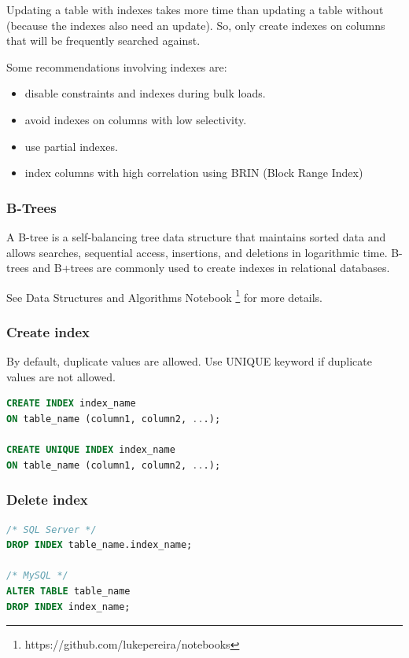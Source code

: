 \documentclass{article}
\begin{document}
Updating a table with indexes takes more time than updating a table without (because the indexes also need an update). So, only create indexes on columns that will be frequently searched against.

Some recommendations involving indexes are:
\begin{itemize}
    \item disable constraints and indexes during bulk loads.
    \item avoid indexes on columns with low selectivity.
    \item use partial indexes.
    \item index columns with high correlation using BRIN (Block Range Index)
\end{itemize}

\subsubsection{B-Trees}
A B-tree is a self-balancing tree data structure that maintains sorted data and allows searches, sequential access, insertions, and deletions in logarithmic time. B-trees and B+trees are commonly used to create indexes in relational databases.

See Data Structures and Algorithms Notebook \footnote{https://github.com/lukepereira/notebooks} for more details. 

\subsubsection{Create index}
By default, duplicate values are allowed. Use UNIQUE keyword if duplicate values are not allowed.

\vspace{8pt} \begin{lstlisting}[language=SQL]
CREATE INDEX index_name
ON table_name (column1, column2, ...);

CREATE UNIQUE INDEX index_name
ON table_name (column1, column2, ...);
\end{lstlisting} \vspace{8pt}

\subsubsection{Delete index}

\vspace{8pt} \begin{lstlisting}[language=SQL]
/* SQL Server */
DROP INDEX table_name.index_name;

/* MySQL */
ALTER TABLE table_name
DROP INDEX index_name;
\end{lstlisting} \vspace{8pt}
\end{document}
